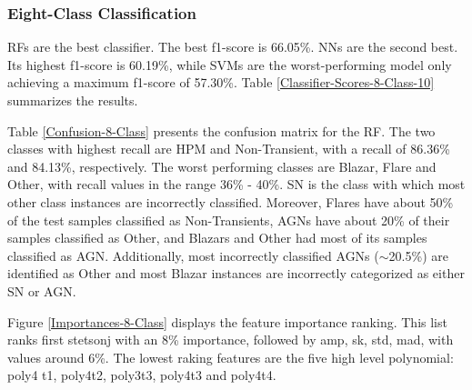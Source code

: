 \documentclass[a4paper,fleqn,usenatbib]{mnras}
\begin{document}
\subsubsection{Eight-Class Classification}


RFs are the best classifier. 
The best f1-score is 66.05\%. 
NNs are the second best. 
Its highest f1-score is 60.19\%, while SVMs are the worst-performing
model only achieving a maximum f1-score of 57.30\%.
Table \ref{Classifier-Scores-8-Class-10} summarizes the results. 


Table \ref{Confusion-8-Class} presents the confusion matrix for the RF.
The two classes with highest recall are HPM and Non-Transient, with a
recall of 86.36\% and 84.13\%, respectively. 
The worst performing classes are Blazar, Flare and Other, with recall
values in the range 36\% - 40\%. 
SN is the class with which most other class instances are
incorrectly classified. 
Moreover, Flares have about 50\% of the test samples classified as
Non-Transients, AGNs have about 20\% of their 
samples classified as Other, and Blazars and Other had most of  its
samples classified as AGN. 
Additionally, most incorrectly classified AGNs ($\sim$20.5\%) are
identified as Other and most Blazar instances are
incorrectly categorized as either SN or AGN. 


Figure \ref{Importances-8-Class} displays the feature importance ranking.
This list ranks first stetson\textunderscore j with an 8\% importance,
followed by amp, sk, std, mad, with values around 6\%. 
The lowest raking features are the five high level polynomial: poly4\textunderscore
t1,  poly4\textunderscore t2, poly3\textunderscore t3,
poly4\textunderscore t3 and poly4\textunderscore t4. 
\end{document}
